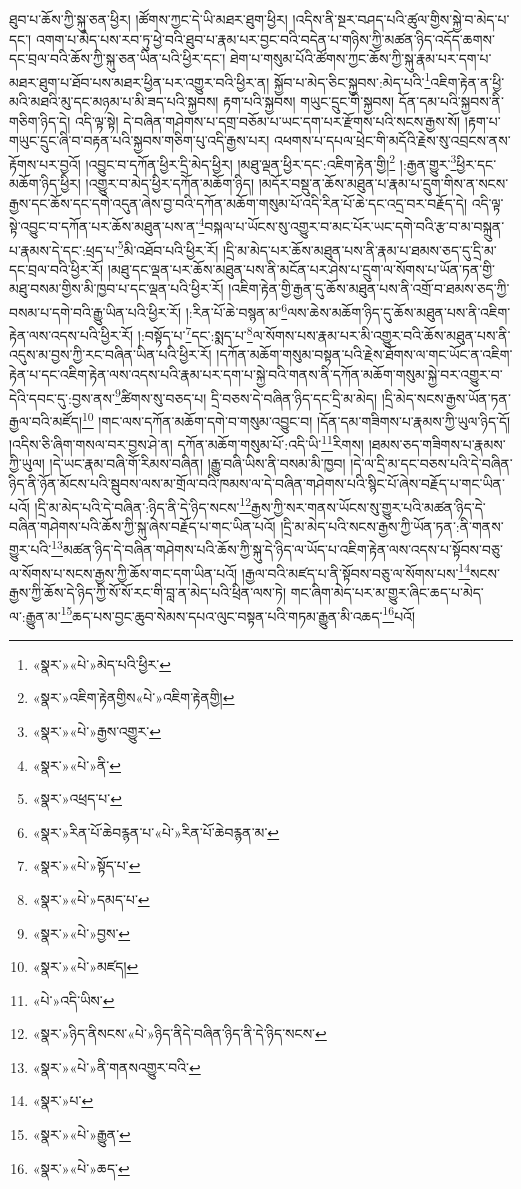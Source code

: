 ཐུབ་པ་ཆོས་ཀྱི་སྐུ་ཅན་ཕྱིར། །ཚོགས་ཀྱང་དེ་ཡི་མཐར་ཐུག་ཕྱིར། །འདིས་ནི་སྔར་བཤད་པའི་ཚུལ་གྱིས་སྐྱེ་བ་མེད་པ་དང་། འགག་པ་མེད་པས་རབ་ཏུ་ཕྱེ་བའི་ཐུབ་པ་རྣམ་པར་བྱང་བའི་བདེན་པ་གཉིས་ཀྱི་མཚན་ཉིད་འདོད་ཆགས་དང་བྲལ་བའི་ཆོས་ཀྱི་སྐུ་ཅན་ཡིན་པའི་ཕྱིར་དང་། ཐེག་པ་གསུམ་པོའི་ཚོགས་ཀྱང་ཆོས་ཀྱི་སྐུ་རྣམ་པར་དག་པ་མཐར་ཐུག་པ་ཐོབ་པས་མཐར་ཕྱིན་པར་འགྱུར་བའི་ཕྱིར་ན། སྐྱོབ་པ་མེད་ཅིང་སྐྱབས་:མེད་པའི་\footnote{«སྣར་»«པེ་»མེད་པའི་ཕྱིར་}འཇིག་རྟེན་ན་ཕྱི་མའི་མཐའི་མུ་དང་མཉམ་པ་མི་ཟད་པའི་སྐྱབས། རྟག་པའི་སྐྱབས། གཡུང་དྲུང་གི་སྐྱབས། དོན་དམ་པའི་སྐྱབས་ནི་གཅིག་ཉིད་དེ། འདི་ལྟ་སྟེ། དེ་བཞིན་གཤེགས་པ་དགྲ་བཅོམ་པ་ཡང་དག་པར་རྫོགས་པའི་སངས་རྒྱས་སོ། །རྟག་པ་གཡུང་དྲུང་ཞི་བ་བརྟན་པའི་སྐྱབས་གཅིག་པུ་འདི་རྒྱས་པར། འཕགས་པ་དཔལ་ཕྲེང་གི་མདོའི་རྗེས་སུ་འབྲངས་ནས་རྟོགས་པར་བྱའོ། །འབྱུང་བ་དཀོན་ཕྱིར་དྲི་མེད་ཕྱིར། །མཐུ་ལྡན་ཕྱིར་དང་:འཇིག་རྟེན་གྱི།\footnote{«སྣར་»འཇིག་རྟེནགྱིས«པེ་»འཇིག་རྟེནགྱི།} །:རྒྱན་གྱུར་\footnote{«སྣར་»«པེ་»རྒྱས་འགྱུར་}ཕྱིར་དང་མཆོག་ཉིད་ཕྱིར། །འགྱུར་བ་མེད་ཕྱིར་དཀོན་མཆོག་ཉིད། །མདོར་བསྡུ་ན་ཆོས་མཐུན་པ་རྣམ་པ་དྲུག་གིས་ན་སངས་རྒྱས་དང་ཆོས་དང་དགེ་འདུན་ཞེས་བྱ་བའི་དཀོན་མཆོག་གསུམ་པོ་འདི་རིན་པོ་ཆེ་དང་འདྲ་བར་བརྗོད་དེ། འདི་ལྟ་སྟེ་འབྱུང་བ་དཀོན་པར་ཆོས་མཐུན་པས་ན་\footnote{«སྣར་»«པེ་»ནི་}བསྐལ་པ་ཡོངས་སུ་འགྱུར་བ་མང་པོར་ཡང་དགེ་བའི་རྩ་བ་མ་བསྐྲུན་པ་རྣམས་དེ་དང་:ཕྲད་པ་\footnote{«སྣར་»འཕྲད་པ་}མི་འཐོབ་པའི་ཕྱིར་རོ། །དྲི་མ་མེད་པར་ཆོས་མཐུན་པས་ནི་རྣམ་པ་ཐམས་ཅད་དུ་དྲི་མ་དང་བྲལ་བའི་ཕྱིར་རོ། །མཐུ་དང་ལྡན་པར་ཆོས་མཐུན་པས་ནི་མངོན་པར་ཤེས་པ་དྲུག་ལ་སོགས་པ་ཡོན་ཏན་གྱི་མཐུ་བསམ་གྱིས་མི་ཁྱབ་པ་དང་ལྡན་པའི་ཕྱིར་རོ། །འཇིག་རྟེན་གྱི་རྒྱན་དུ་ཆོས་མཐུན་པས་ནི་འགྲོ་བ་ཐམས་ཅད་ཀྱི་བསམ་པ་དགེ་བའི་རྒྱུ་ཡིན་པའི་ཕྱིར་རོ། །:རིན་པོ་ཆེ་བསྙན་མ་\footnote{«སྣར་»རིན་པོ་ཆེབརྙན་པ་«པེ་»རིན་པོ་ཆེབརྙན་མ་}ལས་ཆེས་མཆོག་ཉིད་དུ་ཆོས་མཐུན་པས་ནི་འཇིག་རྟེན་ལས་འདས་པའི་ཕྱིར་རོ། །:བསྟོད་པ་\footnote{«སྣར་»«པེ་»སྟོད་པ་}དང་:སྨད་པ་\footnote{«སྣར་»«པེ་»དམད་པ་}ལ་སོགས་པས་རྣམ་པར་མི་འགྱུར་བའི་ཆོས་མཐུན་པས་ནི་འདུས་མ་བྱས་ཀྱི་རང་བཞིན་ཡིན་པའི་ཕྱིར་རོ། །དཀོན་མཆོག་གསུམ་བསྟན་པའི་རྗེས་ཐོགས་ལ་གང་ཡོང་ན་འཇིག་རྟེན་པ་དང་འཇིག་རྟེན་ལས་འདས་པའི་རྣམ་པར་དག་པ་སྐྱེ་བའི་གནས་ནི་དཀོན་མཆོག་གསུམ་སྐྱེ་བར་འགྱུར་བ་དེའི་དབང་དུ་:བྱས་ནས་\footnote{«སྣར་»«པེ་»བྱས་}ཚིགས་སུ་བཅད་པ། དྲི་བཅས་དེ་བཞིན་ཉིད་དང་དྲི་མ་མེད། །དྲི་མེད་སངས་རྒྱས་ཡོན་ཏན་རྒྱལ་བའི་མཛོད།\footnote{«སྣར་»«པེ་»མཛད།} །གང་ལས་དཀོན་མཆོག་དགེ་བ་གསུམ་འབྱུང་བ། །དོན་དམ་གཟིགས་པ་རྣམས་ཀྱི་ཡུལ་ཉིད་དོ། །འདིས་ཅི་ཞིག་གསལ་བར་བྱས་ཤེ་ན། དཀོན་མཆོག་གསུམ་པོ་:འདི་ཡི་\footnote{«པེ་»འདི་ཡིས་}རིགས། །ཐམས་ཅད་གཟིགས་པ་རྣམས་ཀྱི་ཡུལ། །དེ་ཡང་རྣམ་བཞི་གོ་རིམས་བཞིན། །རྒྱུ་བཞི་ཡིས་ནི་བསམ་མི་ཁྱབ། །དེ་ལ་དྲི་མ་དང་བཅས་པའི་དེ་བཞིན་ཉིད་ནི་ཉོན་མོངས་པའི་སྦུབས་ལས་མ་གྲོལ་བའི་ཁམས་ལ་དེ་བཞིན་གཤེགས་པའི་སྙིང་པོ་ཞེས་བརྗོད་པ་གང་ཡིན་པའོ། །དྲི་མ་མེད་པའི་དེ་བཞིན་:ཉིད་ནི་དེ་ཉིད་སངས་\footnote{«སྣར་»ཉིད་ནིསངས་«པེ་»ཉིད་ནིདེ་བཞིན་ཉིད་ནི་དེ་ཉིད་སངས་}རྒྱས་ཀྱི་སར་གནས་ཡོངས་སུ་གྱུར་པའི་མཚན་ཉིད་དེ་བཞིན་གཤེགས་པའི་ཆོས་ཀྱི་སྐུ་ཞེས་བརྗོད་པ་གང་ཡིན་པའོ། །དྲི་མ་མེད་པའི་སངས་རྒྱས་ཀྱི་ཡོན་ཏན་:ནི་གནས་གྱུར་པའི་\footnote{«སྣར་»«པེ་»ནི་གནསའགྱུར་བའི་}མཚན་ཉིད་དེ་བཞིན་གཤེགས་པའི་ཆོས་ཀྱི་སྐུ་དེ་ཉིད་ལ་ཡོད་པ་འཇིག་རྟེན་ལས་འདས་པ་སྟོབས་བཅུ་ལ་སོགས་པ་སངས་རྒྱས་ཀྱི་ཆོས་གང་དག་ཡིན་པའོ། །རྒྱལ་བའི་མཛད་པ་ནི་སྟོབས་བཅུ་ལ་སོགས་པས་\footnote{«སྣར་»པ་}སངས་རྒྱས་ཀྱི་ཆོས་དེ་ཉིད་ཀྱི་སོ་སོ་རང་གི་བླ་ན་མེད་པའི་ཕྲིན་ལས་ཏེ། གང་ཞིག་མེད་པར་མ་གྱུར་ཞིང་ཆད་པ་མེད་ལ་:རྒྱུན་མ་\footnote{«སྣར་»«པེ་»རྒྱུན་}ཆད་པས་བྱང་ཆུབ་སེམས་དཔའ་ལུང་བསྟན་པའི་གཏམ་རྒྱུན་མི་འཆད་\footnote{«སྣར་»«པེ་»ཆད་}པའོ། 